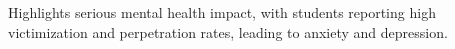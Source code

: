 Highlights serious mental health impact, with students reporting high victimization and perpetration rates, leading to anxiety and depression.